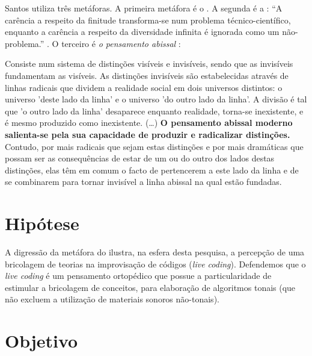 Santos utiliza três metáforas. A primeira metáfora é o . A segunda é a : ``A carência a respeito da finitude transforma-se num problema técnico-científico, enquanto a carência a respeito da diversidade infinita é ignorada como um não-problema.'' \cite[p.~15]{santos_filosofia_2008}. O terceiro é \emph{o pensamento abissal} \cite[p.~1--4]{santos_abissal_2007}:

\begin{citacao}
Consiste num sistema de distinções visíveis e invisíveis, sendo que as invisíveis fundamentam as visíveis. As distinções invisíveis são estabelecidas através de linhas radicais que dividem a realidade social em dois universos distintos: o universo  'deste lado da linha' e o universo 'do outro lado da linha'. A divisão é tal que 'o outro lado da linha' desaparece enquanto realidade, torna-se inexistente, e é mesmo produzido como inexistente. (\ldots) \textbf{O pensamento abissal moderno salienta-se pela sua capacidade de produzir e radicalizar distinções.} Contudo, por mais radicais que sejam estas distinções e por mais dramáticas que possam ser as consequências de estar de um ou do outro dos lados destas distinções, elas têm em comum o facto de pertencerem a este lado da linha e de se combinarem para tornar invisível a linha abissal na qual estão fundadas. \end{citacao}

\section*{Hipótese}

A digressão da metáfora do  ilustra, na esfera desta pesquisa, a percepção de uma bricolagem de teorias na improvisação de códigos (\emph{live coding}). Defendemos que o \emph{live coding} é um pensamento ortopédico que possue a particularidade de estimular a bricolagem de conceitos, para elaboração de algoritmos tonais (que não excluem a utilização de materiais sonoros não-tonais). 

\section*{Objetivo}

